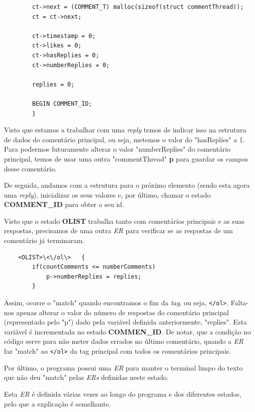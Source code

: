 \documentclass[a4paper,12pt]{report}
\newcommand*{\xml}[1]{\texttt{<#1>}}
\begin{document}
\begin{itemize}
\begin{verbatim}
        ct->next = (COMMENT_T) malloc(sizeof(struct commentThread));
        ct = ct->next;

        ct->timestamp = 0;
        ct->likes = 0;
        ct->hasReplies = 0;
        ct->numberReplies = 0;

        replies = 0;

        BEGIN COMMENT_ID;
        }
\end{verbatim}

\par Visto que estamos a trabalhar com uma \textit{reply} temos de indicar isso na estrutura de dados do comentário principal, ou seja, metemos o valor do "hasReplies" a 1. Para podermos futuramente alterar o valor "numberReplies" do comentário principal, temos de usar uma outra "commentThread" \textbf{p} para guardar os campos desse comentário.
\par De seguida, andamos com a estrutura para o próximo elemento (sendo esta agora uma \textit{reply}),  inicializar os seus valores e, por último, chamar o estado \textbf{COMMENT\_ID} para obter o seu id.

\vspace{1cm}

\par Visto que o estado \textbf{OLIST} trabalha tanto com comentários principais e as suas respostas, precisamos de uma outra \textit{ER} para verificar se as respostas de um comentário já terminaram.

\begin{verbatim}
    <OLIST>\<\/ol\>   { 
        if(countComments <= numberComments)
            p->numberReplies = replies;
        }
\end{verbatim}

\par Assim, ocorre o "match" quando encontramos o fim da \textit{tag}, ou seja, \xml{/ol}. Falta-nos apenas alterar o valor do número de respostas do comentário principal (representado pelo "p") dado pela variável definida anteriormente, "replies". Esta variável é incrementada no estado \textbf{COMMEN\_ID}.
De notar, que a condição no código serve para não meter dados errados no último comentário, quando a \textit{ER} faz "match" ao \xml{/ol} da tag principal com todos os comentários principais.

\vspace{0.5cm}

\par Por último, o programa possui uma \textit{ER} para manter o terminal limpo do texto que não deu "match" pelas \textit{ERs} definidas neste estado.
\par Esta \textit{ER} é definida várias vezes ao longo do programa e dos diferentes estados, pelo que a explicação é semelhante.
\end{itemize}
\end{document}
